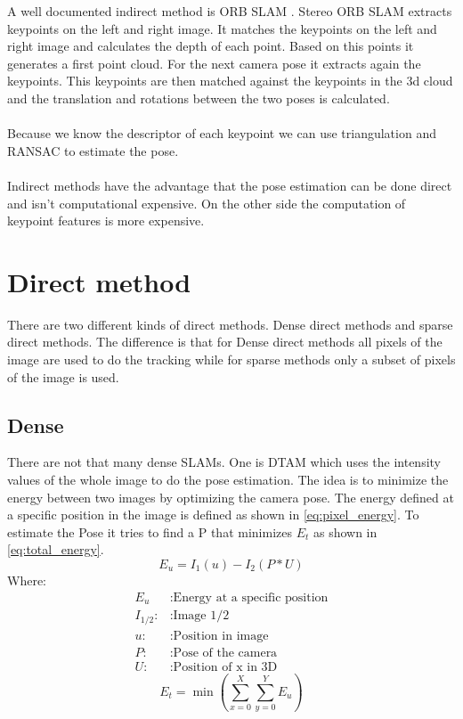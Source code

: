 \documentclass[11pt,a4paper,titlepage,oneside]{report}
\begin{document}
A well documented indirect method is ORB SLAM \cite{orbslam}. Stereo ORB SLAM extracts keypoints on the left and right image. It matches the keypoints on the left and right image and calculates the depth of each point. Based on this points it generates a first point cloud. For the next camera pose it extracts again the keypoints. This keypoints are then matched against the keypoints in the 3d cloud and the translation and rotations between the two poses is calculated.\\\\
Because we know the descriptor of each keypoint we can use triangulation and RANSAC to estimate the pose.\\\\
Indirect methods have the advantage that the pose estimation can be done direct and isn't computational expensive. On the other side the computation of keypoint features is more expensive.

\section{Direct method}

There are two different kinds of direct methods. Dense direct methods and sparse direct methods. The difference is that for Dense direct methods all pixels of the image are used to do the tracking while for sparse methods only a subset of pixels of the image is used.

\subsection{Dense}

There are not that many dense SLAMs. One is DTAM which uses the intensity values of the whole image to do the pose estimation. The idea is to minimize the energy between two images by optimizing the camera pose. The energy defined at a specific position in the image is defined as shown in \ref{eq:pixel_energy}. To estimate the Pose it tries to find a P that minimizes $E_{t}$ as shown in \ref{eq:total_energy}.
\begin{equation}\label{eq:pixel_energy}
  E_{u}=I_1(u)-I_2(P*U)
\end{equation}
Where:
\begin{align*}
  E_{u}		&: \text{Energy at a specific position}\\
  I_{1/2}:	&: \text{Image 1/2}\\
  u:		&: \text{Position in image} \\
  P:		&: \text{Pose of the camera} \\
  U:		&: \text{Position of x in 3D}
\end{align*}
\begin{equation}\label{eq:total_energy}
  E_{t}=\min(\sum_{x=0}^X\sum_{y=0}^YE_u)
\end{equation}
\end{document}
